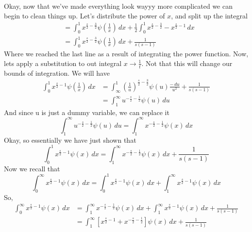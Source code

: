 \documentclass{article}
\begin{document}
Okay, now that we've made everything look wayyy more complicated we can begin to clean things up. Let's distribute the power of $x$, and split up the integral
\begin{equation*}
    \begin{split}
    &=\int_{0}^{1} x^{\frac{s}{2}-\frac{3}{2}}\psi\left(\frac{1}{x}\right)\,dx+\frac{1}{2}\int_{0}^{1}x^{\frac{s}{2}-\frac{3}{2}}-x^{\frac{s}{2}-1}\,dx\\
    &=\int_{0}^{1} x^{\frac{s}{2}-\frac{3}{2}}\psi\left(\frac{1}{x}\right)\,dx+\frac{1}{s(s-1)}
    \end{split}
\end{equation*}
Where we reached the last line as a result of integrating the power function. Now, lets apply a substitution to out integral $x\rightarrow \frac{1}{t}$. Not that this will change our bounds of integration. We will have
\begin{equation*}
    \begin{split}
        \int_{0}^{1}  x^{\frac{s}{2}-1}\psi\left(\frac{1}{x}\right)\,dx&=\int_{\infty}^{1} \left(\frac{1}{u}\right)^{\frac{s}{2}-\frac{3}{2}}\psi(u)\frac{-\,du}{u^2}+\frac{1}{s(s-1)}\\
        &=\int_{1}^{\infty} u^{-\frac{s}{2}-\frac{1}{2}}\psi(u)\,du
    \end{split}
\end{equation*}
And since u is just a dummy variable, we can replace it
\begin{equation*}
    \int_{1}^{\infty} u^{-\frac{s}{2}-\frac{1}{2}}\psi(u)\,du=\int_{1}^{\infty} x^{-\frac{s}{2}-\frac{1}{2}}\psi(x)\,dx
\end{equation*}   
Okay, so essentially we have just shown that
\begin{equation*}
    \int_{0}^{1}  x^{\frac{s}{2}-1}\psi(x)\,dx=\int_{1}^{\infty}x^{-\frac{s}{2}-\frac{1}{2}}\psi(x)\,dx+\frac{1}{s(s-1)}
\end{equation*}
Now we recall that
\begin{equation*}
\int_{0}^{\infty}  x^{\frac{s}{2}-1}\psi(x)\,dx=\int_{0}^{1}  x^{\frac{s}{2}-1}\psi(x)\,dx+\int_{1}^{\infty}  x^{\frac{s}{2}-1}\psi(x)\,dx
\end{equation*}
So,
\begin{equation*}
    \begin{split}
        \int_{0}^{\infty}  x^{\frac{s}{2}-1}\psi(x)\,dx&=\int_{1}^{\infty}  x^{-\frac{s}{2}-\frac{1}{2}}\psi(x)\,dx+\int_{1}^{\infty}  x^{\frac{s}{2}-1}\psi(x)\,dx+\frac{1}{s(s-1)} \\
        &=\int_{1}^{\infty}\left[x^{\frac{s}{2}-1}+x^{-\frac{s}{2}-\frac{1}{2}}\right]\psi(x)\,dx+\frac{1}{s(s-1)}
    \end{split}
\end{equation*}
\end{document}
